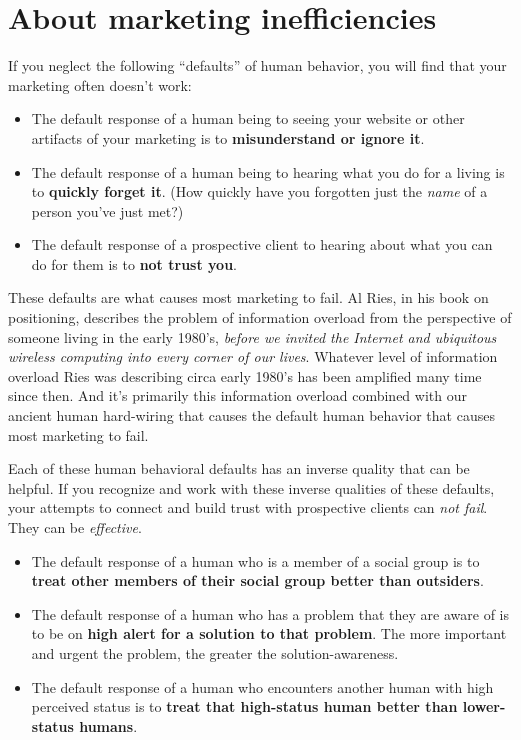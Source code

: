 \section{About marketing inefficiencies}

If you neglect the following ``defaults'' of human behavior, you will find that your marketing often doesn't work:

\begin{itemize}
\item The default response of a human being to seeing your website or other artifacts of your marketing is to \textbf{misunderstand or ignore it}.
\item The default response of a human being to hearing what you do for a living is to \textbf{quickly forget it}. (How quickly have you forgotten just the \emph{name} of a person you’ve just met?)
\item The default response of a prospective client to hearing about what you can do for them is to \textbf{not trust you}.
\end{itemize}

These defaults are what causes most marketing to fail. Al Ries, in his book on positioning, describes the problem of information overload from the perspective of someone living in the early 1980's, \emph{before we invited the Internet and ubiquitous wireless computing into every corner of our lives}. Whatever level of information overload Ries was describing circa early 1980's has been amplified many time since then. And it's primarily this information overload combined with our ancient human hard-wiring that causes the default human behavior that causes most marketing to fail.

Each of these human behavioral defaults has an inverse quality that can be helpful. If you recognize and work with these inverse qualities of these defaults, your attempts to connect and build trust with prospective clients can \emph{not fail}. They can be \emph{effective}.

\begin{itemize}
\item The default response of a human who is a member of a social group is to \textbf{treat other members of their social group better than outsiders}.
\item The default response of a human who has a problem that they are aware of is to be on \textbf{high alert for a solution to that problem}. The more important and urgent the problem, the greater the solution-awareness.
\item The default response of a human who encounters another human with high perceived status is to \textbf{treat that high-status human better than lower-status humans}.
\end{itemize}

